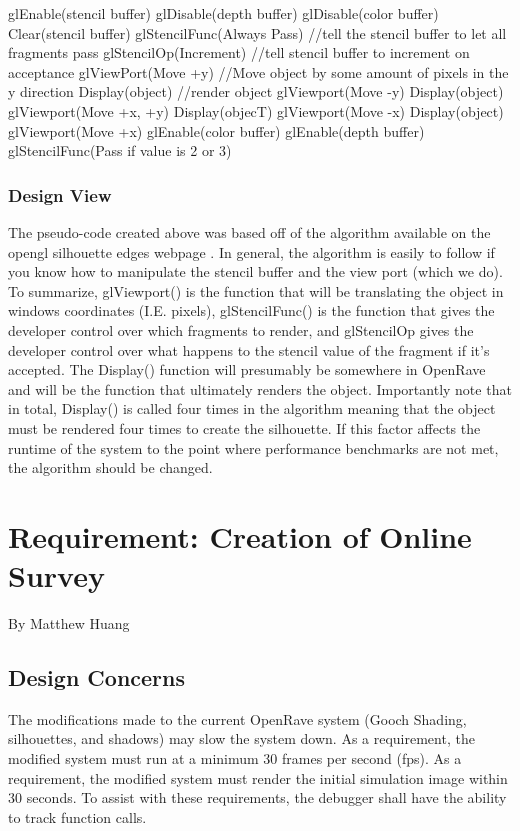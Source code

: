 \documentclass[10pt,journal,compsoc,draftclsnofoot]{IEEEtran}
\begin{document}
\begin{flushleft}
glEnable(stencil buffer)
glDisable(depth buffer)
glDisable(color buffer)
Clear(stencil buffer)
glStencilFunc(Always Pass)	//tell the stencil buffer to let all fragments pass
glStencilOp(Increment)		//tell stencil buffer to increment on acceptance
glViewPort(Move +y)	//Move object by some amount of pixels in the y direction
Display(object)		//render object
glViewport(Move -y)
Display(object)
glViewport(Move +x, +y)
Display(objecT)
glViewport(Move -x)
Display(object)
glViewport(Move +x)
glEnable(color buffer)
glEnable(depth buffer)
glStencilFunc(Pass if value is 2 or 3)

\subsubsection{Design View}
The pseudo-code created above was based off of the algorithm available on the opengl silhouette edges webpage \cite{siledges}.
In general, the algorithm is easily to follow if you know how to manipulate the stencil buffer and the view port (which we do).
To summarize, glViewport() is the function that will be translating the object in windows coordinates (I.E. pixels), glStencilFunc() is the function that gives the developer control over which fragments to render, and glStencilOp gives the developer control over what happens to the stencil value of the fragment if it's accepted.
The Display() function will presumably be somewhere in OpenRave and will be the function that ultimately renders the object.
Importantly note that in total, Display() is called four times in the algorithm meaning that the object must be rendered four times to create the silhouette.
If this factor affects the runtime of the system to the point where performance benchmarks are not met, the algorithm should be changed.

\newpage

\section{Requirement: Creation of Online Survey}
\large{By Matthew Huang}

\normalsize
\subsection{Design Concerns}
The modifications made to the current OpenRave system (Gooch Shading, silhouettes, and shadows) may slow the system down.
As a requirement, the modified system must run at a minimum 30 frames per second (fps).
As a requirement, the modified system must render the initial simulation image within 30 seconds.
To assist with these requirements, the debugger shall have the ability to track function calls.


\end{flushleft}
\end{document}
